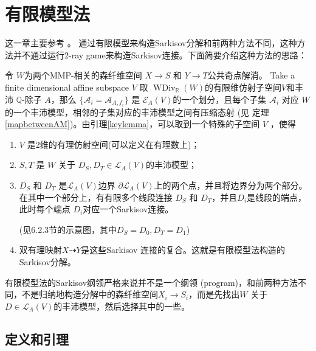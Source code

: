 \chapter{有限模型法}\label{thirdmethod}
这一章主要参考 \cite{haconSarkisovProgram2012}。 通过有限模型来构造Sarkisov分解和前两种方法不同，这种方法并不通过运行2-ray game来构造Sarkisov连接。下面简要介绍这种方法的思路：

令 $W$为两个MMP-相关的森纤维空间 $X\to S$ 和 $Y\to T$公共奇点解消。 Take a finite dimensional affine subspace $V$ 取 $\operatorname{WDiv}_{\mathbb{R}}(W)$的有限维仿射子空间$V$和丰沛 $\mathbb{Q}$-除子 $A$，那么 $\{\mathcal{A}_{i} =\mathcal{A}_{A,f_{i}}\} $ 是 $\mathcal{E}_{A}(V)$的一个划分，且每个子集 $\mathcal{A}_{i}$ 对应 $W$的一个丰沛模型，相邻的子集对应的丰沛模型之间有压缩态射 (见 定理\ref{mapbetweenAM})。由引理\ref{keylemma}，可以取到一个特殊的子空间 $V$ ，使得 
\begin{enumerate}
  \item $V$ 是2维的有理仿射空间(可以定义在有理数上)； 
  \item $S,T$ 是 $W$ 关于 $D_{S},D_{T} \in \mathcal{L}_{A}(V) $的丰沛模型；
  \item $D_{S}$ 和 $D_{T}$ 是$\mathcal{L}_{A}(V)$边界 $\partial \mathcal{L}_{A}(V)$上的两个点，并且将边界分为两个部分。在其中一个部分上，有有限多个线段连接 $D_{S}$ 和 $D_{T}$，并且$D_{i}$是线段的端点，此时每个端点 $ D_{i}$对应一个Sarkisov连接。

    (见6.2.3节的示意图，其中$D_S=D_0,D_T=D_1$)
  \item 双有理映射$X\dashrightarrow Y$是这些Sarkisov 连接的复合。这就是有限模型法构造的Sarkisov分解。
\end{enumerate}
\begin{remark}
  有限模型法的Sarkisov纲领严格来说并不是一个纲领 (program)，和前两种方法不同，不是归纳地构造分解中的森纤维空间$X_{i}\to S_{i}$，而是先找出$W$ 关于$D \in \mathcal{L}_{A}(V)$的丰沛模型，然后选择其中的一些。
\end{remark}


\section{定义和引理}

